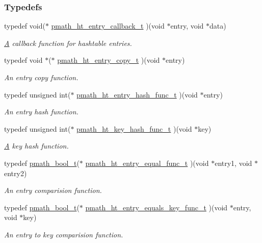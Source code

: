 \subsubsection*{Typedefs}
\begin{CompactItemize}
\item 
typedef void($\ast$ \hyperlink{group__hashtables_g49afb121d94e186dd0c129a7ac98af88}{pmath\_\-ht\_\-entry\_\-callback\_\-t} )(void $\ast$entry, void $\ast$data)
\begin{CompactList}\small\item\em \hyperlink{class_a}{A} callback function for hashtable entries. \item\end{CompactList}\item 
typedef void $\ast$($\ast$ \hyperlink{group__hashtables_g7afcd0897350cdf6ea146196421d70f1}{pmath\_\-ht\_\-entry\_\-copy\_\-t} )(void $\ast$entry)
\begin{CompactList}\small\item\em An entry copy function. \item\end{CompactList}\item 
typedef unsigned int($\ast$ \hyperlink{group__hashtables_gb427419addea52e7f405dd9cbc6b98b5}{pmath\_\-ht\_\-entry\_\-hash\_\-func\_\-t} )(void $\ast$entry)
\begin{CompactList}\small\item\em An entry hash function. \item\end{CompactList}\item 
typedef unsigned int($\ast$ \hyperlink{group__hashtables_g9285a6676b14812f6b4856493617b3fb}{pmath\_\-ht\_\-key\_\-hash\_\-func\_\-t} )(void $\ast$key)
\begin{CompactList}\small\item\em \hyperlink{class_a}{A} key hash function. \item\end{CompactList}\item 
typedef \hyperlink{group__general__types_gc92090cb0b56345d6c379ed2341d4ef4}{pmath\_\-bool\_\-t}($\ast$ \hyperlink{group__hashtables_g9eeec544dd1335e2b50bf9fedb5e154b}{pmath\_\-ht\_\-entry\_\-equal\_\-func\_\-t} )(void $\ast$entry1, void $\ast$entry2)
\begin{CompactList}\small\item\em An entry comparision function. \item\end{CompactList}\item 
typedef \hyperlink{group__general__types_gc92090cb0b56345d6c379ed2341d4ef4}{pmath\_\-bool\_\-t}($\ast$ \hyperlink{group__hashtables_gb4bf3ce0ea6f0d5b646cd6bc839bed4f}{pmath\_\-ht\_\-entry\_\-equals\_\-key\_\-func\_\-t} )(void $\ast$entry, void $\ast$key)
\begin{CompactList}\small\item\em An entry to key comparision function. \item\end{CompactList}\end{CompactItemize}
